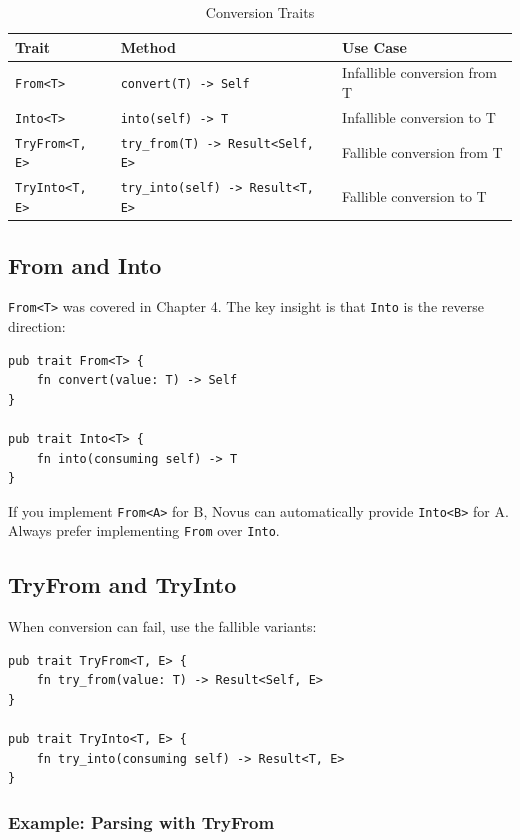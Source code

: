 \begin{table}[h]
\centering
\begin{tabular}{llp{6cm}}
\hline
\textbf{Trait} & \textbf{Method} & \textbf{Use Case} \\
\hline
\texttt{From<T>} & \texttt{convert(T) -> Self} & Infallible conversion from T \\
\texttt{Into<T>} & \texttt{into(self) -> T} & Infallible conversion to T \\
\texttt{TryFrom<T, E>} & \texttt{try\_from(T) -> Result<Self, E>} & Fallible conversion from T \\
\texttt{TryInto<T, E>} & \texttt{try\_into(self) -> Result<T, E>} & Fallible conversion to T \\
\hline
\end{tabular}
\caption{Conversion Traits}
\end{table}

\subsection{From and Into}

\texttt{From<T>} was covered in Chapter 4. The key insight is that \texttt{Into} is the reverse direction:

\begin{lstlisting}
pub trait From<T> {
    fn convert(value: T) -> Self
}

pub trait Into<T> {
    fn into(consuming self) -> T
}
\end{lstlisting}

If you implement \texttt{From<A>} for B, Novus can automatically provide \texttt{Into<B>} for A. Always prefer implementing \texttt{From} over \texttt{Into}.

\subsection{TryFrom and TryInto}

When conversion can fail, use the fallible variants:

\begin{lstlisting}
pub trait TryFrom<T, E> {
    fn try_from(value: T) -> Result<Self, E>
}

pub trait TryInto<T, E> {
    fn try_into(consuming self) -> Result<T, E>
}
\end{lstlisting}

\subsubsection{Example: Parsing with TryFrom}

